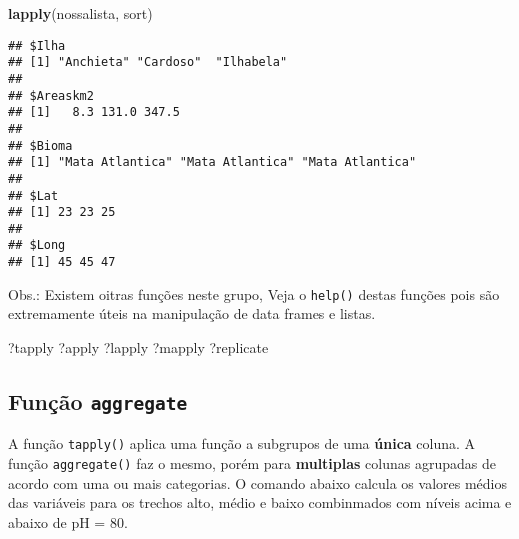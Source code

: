 \documentclass[
]{book}
\newenvironment{Shaded}{\begin{snugshade}}{\end{snugshade}}
\newcommand{\DataTypeTok}[1]{\textcolor[rgb]{0.13,0.29,0.53}{#1}}
\newcommand{\DecValTok}[1]{\textcolor[rgb]{0.00,0.00,0.81}{#1}}
\newcommand{\KeywordTok}[1]{\textcolor[rgb]{0.13,0.29,0.53}{\textbf{#1}}}
\newcommand{\NormalTok}[1]{#1}
\newcommand{\OperatorTok}[1]{\textcolor[rgb]{0.81,0.36,0.00}{\textbf{#1}}}
\newcommand{\StringTok}[1]{\textcolor[rgb]{0.31,0.60,0.02}{#1}}
\begin{document}
\begin{Shaded}
\begin{Highlighting}[]
\KeywordTok{lapply}\NormalTok{(nossalista, sort)}
\end{Highlighting}
\end{Shaded}

\begin{verbatim}
## $Ilha
## [1] "Anchieta" "Cardoso"  "Ilhabela"
## 
## $Areaskm2
## [1]   8.3 131.0 347.5
## 
## $Bioma
## [1] "Mata Atlantica" "Mata Atlantica" "Mata Atlantica"
## 
## $Lat
## [1] 23 23 25
## 
## $Long
## [1] 45 45 47
\end{verbatim}

Obs.: Existem oitras funções neste grupo, Veja o \texttt{help()} destas funções pois são extremamente úteis na manipulação de data frames e listas.

\begin{Shaded}
\begin{Highlighting}[]
\NormalTok{?tapply}
\NormalTok{?apply}
\NormalTok{?lapply}
\NormalTok{?mapply}
\NormalTok{?replicate}
\end{Highlighting}
\end{Shaded}

\hypertarget{funuxe7uxe3o-aggregate}{%
\subsection{\texorpdfstring{Função \texttt{aggregate}}{Função aggregate}}\label{funuxe7uxe3o-aggregate}}

A função \texttt{tapply()} aplica uma função a subgrupos de uma \textbf{única} coluna. A função \texttt{aggregate()} faz o mesmo, porém para \textbf{multiplas} colunas agrupadas de acordo com uma ou mais categorias. O comando abaixo calcula os valores médios das variáveis para os trechos alto, médio e baixo combinmados com níveis acima e abaixo de pH = 80.

\begin{Shaded}
\end{Shaded}
\end{document}
